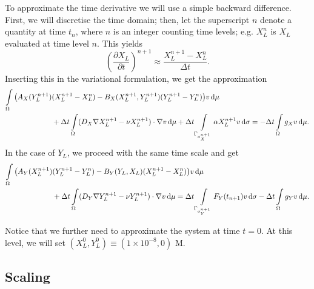 \documentclass[a4paper,doc,11pt]{article}
\begin{document}
To approximate the time derivative we will use a simple backward difference. First, we will discretise the time domain; then, let the superscript $n$ denote a quantity at time $t_n$, where $n$ is an integer counting time levels; e.g. $X_L^n$ is $X_L$ evaluated at time level $n$. This yields
\begin{equation}
    \left(\frac{\partial X_L}{\partial t}\right)^{n+1} \approx \frac{X_L^{n+1} - X_L^n}{\Delta t}.
\end{equation}
Inserting this in the variational formulation, we get the approximation
\begin{equation}
\begin{aligned}
    \int\limits_\Omega
    \big(
    A_X(Y_L^{n+1}) &(X_L^{n+1} - X_L^n) - B_X(X_L^{n+1},Y_L^{n+1}) (Y_L^{n+1} - Y_L^n)  
    \big) v \dif \mu
    \\
    &+
    \Delta t \int\limits_\Omega        (D_X \nabla X_L^{n+1} - \nu X_L^{n+1}) \cdot \nabla v  \dif \mu
    +
    \Delta t \int\limits_{\Gamma_{a_X^{n+1}}}    \alpha X_L^{n+1} v    \dif \sigma
    =
    -\Delta t \int\limits_\Omega        g_X v \dif \mu.
\end{aligned}
\end{equation}
In the case of $Y_L$, we proceed with the same time scale and get
\begin{equation}
\begin{aligned}
    \int\limits_\Omega
    \big(
        A_Y(X_L^{n+1}) & (Y_L^{n+1} - Y_L^n)  - B_Y(Y_L,X_L) (X_L^{n+1} - X_L^n)
    \big) v \dif \mu
    \\
    &
    + \Delta t\int\limits_\Omega        (D_Y \nabla Y_L^{n+1} - \nu Y_L^{n+1}) \cdot \nabla v  \dif \mu
    =
    \Delta t\int\limits_{\Gamma_{a_Y^{n+1}}}     F_Y(t_{n+1}) v    \dif \sigma
    -\Delta t\int\limits_\Omega        g_Y v \dif \mu.
\end{aligned}
\end{equation}

Notice that we further need to approximate the system at time \(t=0\). At this level, we will set \( (X_L^0,Y_L^0) \equiv (1\times 10^{-8},0)\) M.


\subsection{Scaling}
\end{document}
